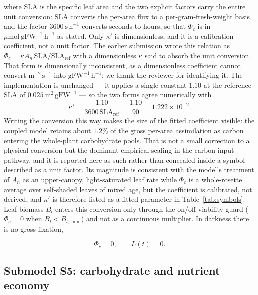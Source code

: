 \documentclass[a4paper,fleqn]{cas-sc}
\begin{document}
where $\mathrm{SLA}$ is the specific leaf area and the two explicit factors
carry the entire unit conversion: $\mathrm{SLA}$ converts the per-area flux
to a per-gram-fresh-weight basis and the factor $3600\ \mathrm{s\,h^{-1}}$
converts seconds to hours, so that $\Phi_c$ is in
$\mu\mathrm{mol\ gFW^{-1}\ h^{-1}}$ as stated. Only $\kappa'$ is
dimensionless, and it is a calibration coefficient, not a unit factor. The
earlier submission wrote this relation as
$\Phi_c=\kappa A_n\,\mathrm{SLA}/\mathrm{SLA}_{\text{ref}}$ with a
dimensionless $\kappa$ said to absorb the unit conversion. That form is
dimensionally inconsistent, as a dimensionless coefficient cannot convert
$\mathrm{m^{-2}\,s^{-1}}$ into $\mathrm{gFW^{-1}\,h^{-1}}$; we thank the
reviewer for identifying it. The implementation is unchanged --- it applies
a single constant $1.10$ at the reference $\mathrm{SLA}$ of
$0.025\ \mathrm{m^{2}\,gFW^{-1}}$ --- so the two forms agree numerically
with
\begin{equation}
\kappa' = \frac{1.10}{3600\,\mathrm{SLA}_{\text{ref}}}
        = \frac{1.10}{90} = 1.222\times10^{-2}.
\label{eq:kappa_prime}
\end{equation}
Writing the conversion this way makes the size of the fitted coefficient
visible: the coupled model retains about $1.2\%$ of the gross per-area
assimilation as carbon entering the whole-plant carbohydrate pools. That is
not a small correction to a physical conversion but the dominant empirical
scaling in the carbon-input pathway, and it is reported here as such rather
than concealed inside a symbol described as a unit factor. Its magnitude is
consistent with the model's treatment of $A_n$ as an upper-canopy,
light-saturated leaf rate while $\Phi_c$ is a whole-rosette average over
self-shaded leaves of mixed age, but the coefficient is calibrated, not
derived, and $\kappa'$ is therefore listed as a fitted parameter in
Table~\ref{tab:symbols}. Leaf biomass $B_l$ enters this
conversion only through the on/off viability guard
($\Phi_c=0$ when $B_l<B_{l,\min}$) and not as a continuous multiplier. In
darkness there is no gross fixation,

\begin{equation}
\Phi_c = 0, \qquad L(t)=0.
\label{eq:PH_night}
\end{equation}

\subsection{Submodel S5: carbohydrate and nutrient economy}
\label{sec:carbohydrates}
\end{document}
